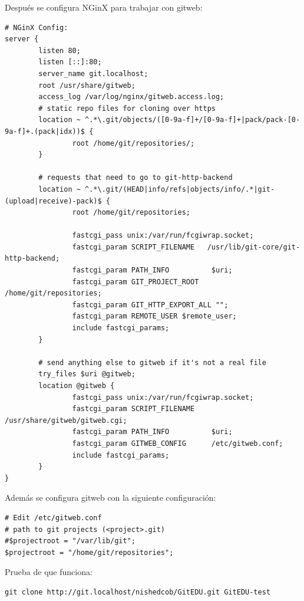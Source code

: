 Después se configura NGinX para trabajar con gitweb:
\begin{lstlisting}
# NGinX Config:
server {
        listen 80;
        listen [::]:80;
        server_name git.localhost;
        root /usr/share/gitweb;
        access_log /var/log/nginx/gitweb.access.log;
        # static repo files for cloning over https
        location ~ ^.*\.git/objects/([0-9a-f]+/[0-9a-f]+|pack/pack-[0-9a-f]+.(pack|idx))$ {
                root /home/git/repositories/;
        }

        # requests that need to go to git-http-backend
        location ~ ^.*\.git/(HEAD|info/refs|objects/info/.*|git-(upload|receive)-pack)$ {
                root /home/git/repositories;

                fastcgi_pass unix:/var/run/fcgiwrap.socket;
                fastcgi_param SCRIPT_FILENAME   /usr/lib/git-core/git-http-backend;
                fastcgi_param PATH_INFO          $uri;
                fastcgi_param GIT_PROJECT_ROOT  /home/git/repositories;
                fastcgi_param GIT_HTTP_EXPORT_ALL "";
                fastcgi_param REMOTE_USER $remote_user;
                include fastcgi_params;
        }

        # send anything else to gitweb if it's not a real file
        try_files $uri @gitweb;
        location @gitweb {
                fastcgi_pass unix:/var/run/fcgiwrap.socket;
                fastcgi_param SCRIPT_FILENAME   /usr/share/gitweb/gitweb.cgi;
                fastcgi_param PATH_INFO          $uri;
                fastcgi_param GITWEB_CONFIG      /etc/gitweb.conf;
                include fastcgi_params;
        }
}
\end{lstlisting}

Además se configura gitweb con la siguiente configuración:
\begin{lstlisting}
# Edit /etc/gitweb.conf
# path to git projects (<project>.git)
#$projectroot = "/var/lib/git";
$projectroot = "/home/git/repositories";
\end{lstlisting}

Prueba de que funciona:
\begin{lstlisting}
git clone http://git.localhost/nishedcob/GitEDU.git GitEDU-test
\end{lstlisting}

 
